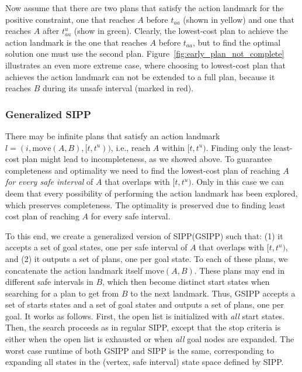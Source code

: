 \documentclass[letterpaper]{article} %
\newcommand{\sipp}{\ac{SIPP}\xspace}
\newcommand{\gsipp}{GSIPP\xspace}
\begin{document}
Now assume that there are two plans that satisfy the action landmark for the positive constraint, one that reaches $A$ before $t_{aa}$ (shown in yellow) and one that reaches $A$ after $t_{aa}^u$ (show in green). 
Clearly, the lowest-cost plan to achieve the action landmark is the one that reaches $A$ before $t_{aa}$, but to find the optimal solution one must use the second plan. 
Figure~\ref{fig:early_plan_not_complete} illustrates an even more extreme case, where choosing to lowest-cost plan that achieves the action landmark can not be extended to a full plan, because it reaches $B$ during its unsafe interval (marked in red). 


\subsubsection{Generalized \sipp}

There may be infinite plans that satisfy an action landmark $l=(i, \text{move}(A,B), [t,t^u))$, i.e., reach $A$ within $[t,t^u)$. Finding only the least-cost plan might lead to incompleteness, as we showed above. To guarantee completeness and optimality we need to find the lowest-cost plan of reaching $A$ \emph{for every safe interval} of $A$ that overlaps with $[t,t^u)$. Only in this case we can deem that every possibility of performing the action landmark has been explored, which preserves completeness. The optimality is preserved due to finding least cost plan of reaching $A$ for every safe interval.  

To this end, we create a generalized version of \sipp (\gsipp) such that: (1) it accepts a set of goal states, one per safe interval of $A$ that overlaps with $[t,t^u)$, and (2) it outputs a set of plans, one per goal state. To each of these plans, we concatenate the action landmark itself $\text{move}(A,B)$. These plans may end in different safe intervals in $B$, which then become distinct start states when searching for a plan to get from $B$ to the next landmark. Thus, \gsipp accepts a set of starts states and a set of goal states and outputs a set of plans, one per goal. 
It works as follows. First, the open list is initialized with 
\emph{all} start states. Then, the search proceeds as in regular \sipp, except that the stop criteria is either when the open list is exhausted or when \emph{all} goal nodes are expanded. The worst case runtime of both \gsipp and \sipp is the same, corresponding to expanding all states in the (vertex, safe interval) state space defined by \sipp.
\end{document}
